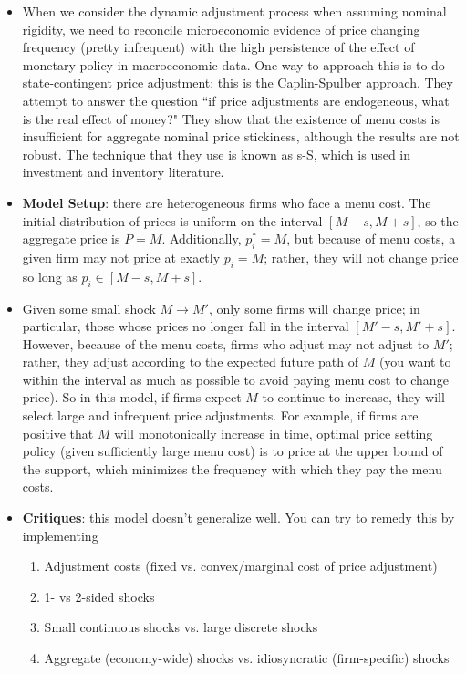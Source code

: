 \documentclass[12pt]{article}
\begin{document}
\begin{itemize}
    \item When we consider the dynamic adjustment process when assuming nominal rigidity, we need to reconcile microeconomic evidence of price changing frequency (pretty infrequent) with the high persistence of the effect of monetary policy in macroeconomic data. One way to approach this is to do state-contingent price adjustment: this is the Caplin-Spulber approach. They attempt to answer the question ``if price adjustments are endogeneous, what is the real effect of money?" They show that the existence of menu costs is insufficient for aggregate nominal price stickiness, although the results are not robust. The technique that they use is known as s-S, which is used in investment and inventory literature. 
    \item \textbf{Model Setup}: there are heterogeneous firms who face a menu cost. The initial distribution of prices is uniform on the interval $[M-s, M+s]$, so the aggregate price is $P = M$. Additionally, $p_i^* = M$, but because of menu costs, a given firm may not price at exactly $p_i = M$; rather, they will not change price so long as $p_i \in [M-s, M+s]$. 
    \item Given some small shock $M \rightarrow M'$, only some firms will change price; in particular, those whose prices no longer fall in the interval $[M'-s, M'+s]$. However, because of the menu costs, firms who adjust may not adjust to $M'$; rather, they adjust according to the expected future path of $M$ (you want to within the interval as much as possible to avoid paying menu cost to change price). So in this model, if firms expect $M$ to continue to increase, they will select large and infrequent price adjustments. For example, if firms are positive that $M$ will monotonically increase in time, optimal price setting policy (given sufficiently large menu cost) is to price at the upper bound of the support, which minimizes the frequency with which they pay the menu costs.
    \item \textbf{Critiques}: this model doesn't generalize well. You can try to remedy this by implementing
    \begin{enumerate}
        \item Adjustment costs (fixed vs. convex/marginal cost of price adjustment)
        \item 1- vs 2-sided shocks
        \item Small continuous shocks vs. large discrete shocks
        \item Aggregate (economy-wide) shocks vs. idiosyncratic (firm-specific) shocks

\end{enumerate}
\end{itemize}
\end{document}
